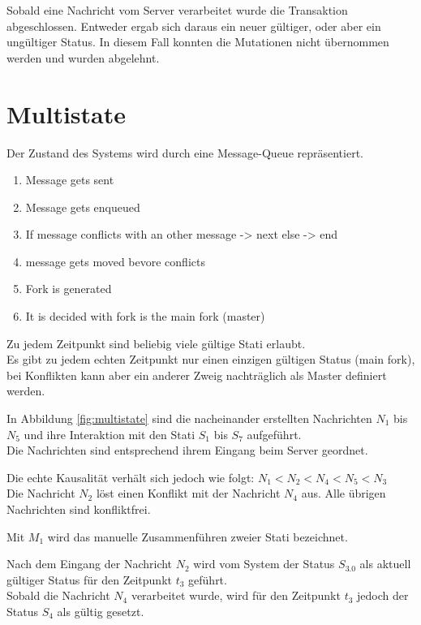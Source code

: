 \documentclass[oneside,11pt,parskip=half,ngerman]{scrreprt}
\begin{document}
Sobald eine Nachricht vom Server verarbeitet wurde die Transaktion
abgeschlossen. Entweder ergab sich daraus ein neuer gültiger, oder aber
ein ungültiger Status. In diesem Fall konnten die Mutationen nicht
übernommen werden und wurden abgelehnt.

\newpage

\section{Multistate}\label{multistate}

Der Zustand des Systems wird durch eine Message-Queue repräsentiert.

\begin{enumerate}
\def\labelenumi{\arabic{enumi}.}
\itemsep1pt\parskip0pt
\item
  Message gets sent
\item
  Message gets enqueued
\item
  If message conflicts with an other message -\textgreater{} next else
  -\textgreater{} end
\item
  message gets moved bevore conflicts
\item
  Fork is generated
\item
  It is decided with fork is the main fork (master)
\end{enumerate}

Zu jedem Zeitpunkt sind beliebig viele gültige Stati erlaubt.\\Es gibt
zu jedem echten Zeitpunkt nur einen einzigen gültigen Status (main
fork), bei Konflikten kann aber ein anderer Zweig nachträglich als
Master definiert werden.

In Abbildung \ref{fig:multistate} sind die nacheinander erstellten
Nachrichten \(N_1\) bis \(N_5\) und ihre Interaktion mit den Stati
\(S_1\) bis \(S_7\) aufgeführt.\\Die Nachrichten sind entsprechend ihrem
Eingang beim Server geordnet.

Die echte Kausalität verhält sich jedoch wie folgt:
\(N_1 < N_2 < N_4 < N_5 < N_3\)\\Die Nachricht \(N_2\) löst einen
Konflikt mit der Nachricht \(N_4\) aus. Alle übrigen Nachrichten sind
konfliktfrei.

Mit \(M_1\) wird das manuelle Zusammenführen zweier Stati bezeichnet.

Nach dem Eingang der Nachricht \(N_2\) wird vom System der Status
\(S_{3.0}\) als aktuell gültiger Status für den Zeitpunkt \(t_3\)
geführt.\\Sobald die Nachricht \(N_4\) verarbeitet wurde, wird für den
Zeitpunkt \(t_3\) jedoch der Status \(S_4\) als gültig gesetzt.
\end{document}
